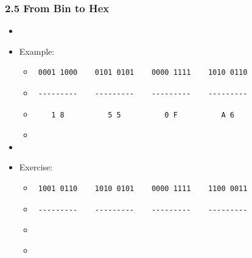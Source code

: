 \begin{frame}[fragile]
  \frametitle{2.5 From Bin to Hex}
    \begin{itemize}
        \item[]
        \item[] Example:
            \begin{itemize}
                \item[] \begin{verbatim} 0001 1000    0101 0101    0000 1111    1010 0110\end{verbatim}
                \item[] \begin{verbatim} ---------    ---------    ---------    ---------\end{verbatim}
		\item[] \begin{verbatim}    1 8          5 5          0 F          A 6   \end{verbatim}
                \item[] 
            \end{itemize}
        \item[]
        \item[] Exercise:
            \begin{itemize}
                \item[] \begin{verbatim} 1001 0110    1010 0101    0000 1111    1100 0011\end{verbatim}
                \item[] \begin{verbatim} ---------    ---------    ---------    ---------\end{verbatim}
                \item[] \begin{verbatim}                                                 \end{verbatim}
                \item[] 
            \end{itemize}
    \end{itemize}
\end{frame}


